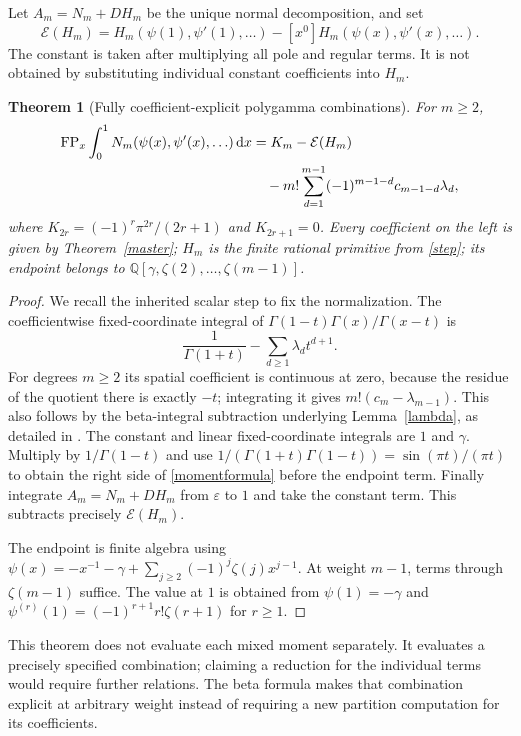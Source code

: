 \documentclass[11pt]{article}
\numberwithin{equation}{section}
\newtheorem{theorem}{Theorem}[section]
\theoremstyle{definition}\newtheorem{definition}[theorem]{Definition}
\theoremstyle{remark}\newtheorem{remark}[theorem]{Remark}
\newcommand{\Q}{\mathbb Q}\newcommand{\C}{\mathbb C}\newcommand{\Ncal}{\mathcal N}\newcommand{\Acal}{\mathcal A}\newcommand{\dd}{\,\mathrm d}
\begin{document}
Let $A_m=N_m+DH_m$ be the unique normal decomposition, and set
\[
 \mathcal E(H_m)=H_m(\psi(1),\psi'(1),\ldots)
              -[x^0]H_m(\psi(x),\psi'(x),\ldots).
\]
The constant is taken after multiplying all pole and regular terms. It is not obtained by substituting individual constant coefficients into $H_m$.

\begin{theorem}[Fully coefficient-explicit polygamma combinations]\label{momenttransfer}
For $m\ge2$,
\begin{equation}\label{momentformula}
\begin{split}
 \FP_x\int_0^1N_m(\psi(x),\psi'(x),\ldots)\dd x
 &=K_m-\mathcal E(H_m)\\
 &\quad-m!\sum_{d=1}^{m-1}(-1)^{m-1-d}c_{m-1-d}\lambda_d,
\end{split}
\end{equation}
where $K_{2r}=(-1)^r\pi^{2r}/(2r+1)$ and $K_{2r+1}=0$.
Every coefficient on the left is given by Theorem~\ref{master}; $H_m$ is the finite rational primitive from \eqref{step}; its endpoint belongs to $\Q[\gamma,\zeta(2),\ldots,\zeta(m-1)]$.
\end{theorem}
\begin{proof}
We recall the inherited scalar step to fix the normalization. The coefficientwise fixed-coordinate integral of
$\Gamma(1-t)\Gamma(x)/\Gamma(x-t)$ is
\[
 \frac1{\Gamma(1+t)}-\sum_{d\ge1}\lambda_dt^{d+1}.
\]
For degrees $m\ge2$ its spatial coefficient is continuous at zero, because the residue of the quotient there is exactly $-t$; integrating it gives $m!(c_m-\lambda_{m-1})$. This also follows by the beta-integral subtraction underlying Lemma~\ref{lambda}, as detailed in \cite{moments}. The constant and linear fixed-coordinate integrals are $1$ and $\gamma$. Multiply by $1/\Gamma(1-t)$ and use $1/(\Gamma(1+t)\Gamma(1-t))=\sin(\pi t)/(\pi t)$ to obtain the right side of \eqref{momentformula} before the endpoint term. Finally integrate $A_m=N_m+DH_m$ from $\varepsilon$ to $1$ and take the constant term. This subtracts precisely $\mathcal E(H_m)$.

The endpoint is finite algebra using
$\psi(x)=-x^{-1}-\gamma+\sum_{j\ge2}(-1)^j\zeta(j)x^{j-1}$.
At weight $m-1$, terms through $\zeta(m-1)$ suffice. The value at $1$ is obtained from $\psi(1)=-\gamma$ and
$\psi^{(r)}(1)=(-1)^{r+1}r!\zeta(r+1)$ for $r\ge1$.
\end{proof}
This theorem does not evaluate each mixed moment separately. It evaluates a precisely specified combination; claiming a reduction for the individual terms would require further relations. The beta formula makes that combination explicit at arbitrary weight instead of requiring a new partition computation for its coefficients.
\end{document}
